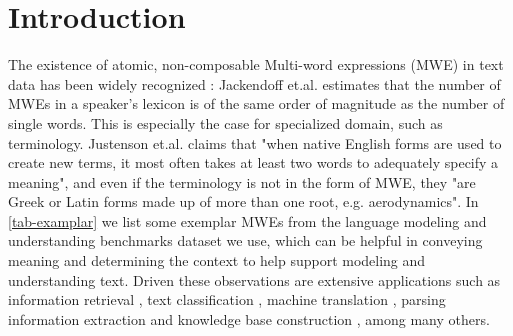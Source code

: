 


\section{Introduction}


The existence of atomic, non-composable Multi-word expressions (MWE) in text data has been widely recognized :  Jackendoff et.al. \cite{jackendoff1997architecture} estimates that 
the number of MWEs in a speaker's lexicon is of the same order of magnitude as the number of single words.
This is especially the case for specialized domain, such as terminology. 
Justenson et.al. \cite{justeson1995technical} claims that 
"when native English forms are used to create new terms, 
it most often takes at least two words to adequately specify a meaning", 
and even if the terminology is not in the form of MWE, they 
"are Greek or Latin forms made up of more than one root, e.g. aerodynamics". 
In \autoref{tab-examplar} we list some exemplar MWEs from the language modeling and understanding benchmarks dataset we use, 
which can be helpful in conveying meaning and determining the context 
to help support modeling and understanding text.
Driven these observations are extensive applications such as information retrieval \cite{xiong2015query, dalton2014entity, shen2018entity}, text classification \cite{furnkranz1998study}, machine translation \cite{koehn2003statistical}, parsing \cite{cafferkey2007multi, savary2015parseme} information extraction and knowledge base construction \cite{banko2007open, wu2012probase, ren2016automatic}, among many others.

